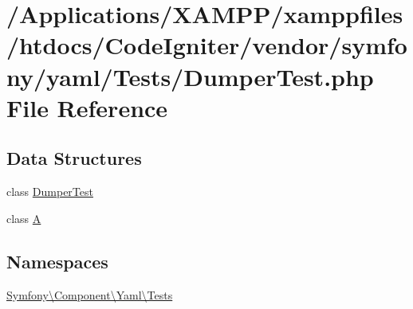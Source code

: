 \hypertarget{_dumper_test_8php}{}\section{/\+Applications/\+X\+A\+M\+P\+P/xamppfiles/htdocs/\+Code\+Igniter/vendor/symfony/yaml/\+Tests/\+Dumper\+Test.php File Reference}
\label{_dumper_test_8php}
\subsection*{Data Structures}
\begin{DoxyCompactItemize}
\item 
class \mbox{\hyperlink{class_symfony_1_1_component_1_1_yaml_1_1_tests_1_1_dumper_test}{Dumper\+Test}}
\item 
class \mbox{\hyperlink{class_symfony_1_1_component_1_1_yaml_1_1_tests_1_1_a}{A}}
\end{DoxyCompactItemize}
\subsection*{Namespaces}
\begin{DoxyCompactItemize}
\item 
 \mbox{\hyperlink{namespace_symfony_1_1_component_1_1_yaml_1_1_tests}{Symfony\textbackslash{}\+Component\textbackslash{}\+Yaml\textbackslash{}\+Tests}}
\end{DoxyCompactItemize}
